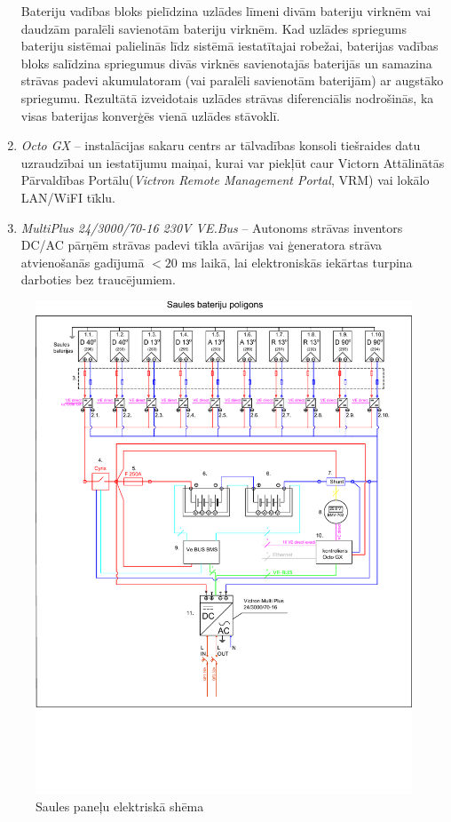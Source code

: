 \begin{enumerate}
Bateriju vadības bloks pielīdzina uzlādes līmeni divām bateriju virknēm vai daudzām paralēli savienotām bateriju virknēm. Kad uzlādes spriegums bateriju sistēmai palielinās līdz sistēmā iestatītajai robežai, baterijas vadības bloks salīdzina spriegumus divās virknēs savienotajās baterijās un samazina strāvas padevi akumulatoram (vai paralēli savienotām baterijām) ar augstāko spriegumu. Rezultātā izveidotais uzlādes strāvas diferenciālis nodrošinās, ka visas baterijas konverģēs vienā uzlādes stāvoklī.
\item \emph{Octo GX} -- instalācijas sakaru centrs ar tālvadības konsoli tiešraides datu uzraudzībai un iestatījumu maiņai, kurai var piekļūt caur Victorn Attālinātās Pārvaldības Portālu(\textit{Victron Remote Management Portal}, VRM) vai lokālo LAN/WiFI tīklu.
\item \emph{MultiPlus 24/3000/70-16 230V VE.Bus}  --
Autonoms strāvas inventors DC/AC pārņēm strāvas padevi tīkla avārijas vai ģeneratora strāva atvienošanās gadījumā $<20$ ms laikā, lai elektroniskās iekārtas turpina darboties bez traucējumiem. 
\end{enumerate}

\begin{figure}[h]
    \centering
    \includegraphics[width=0.7\linewidth]{figures/misc/shema.pdf}
    \caption{Saules paneļu elektriskā shēma}
    \label{fig:shema}
\end{figure}

